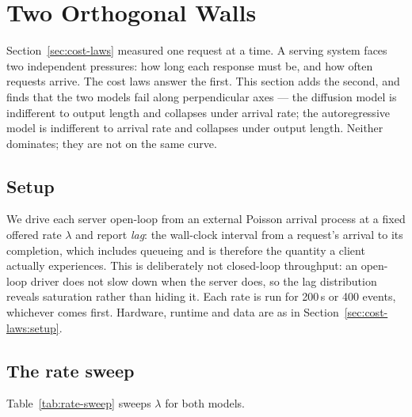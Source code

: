 \section{Two Orthogonal Walls}
\label{sec:two-walls}

Section~\ref{sec:cost-laws} measured one request at a time. A serving system
faces two independent pressures: how long each response must be, and how often
requests arrive. The cost laws answer the first. This section adds the second,
and finds that the two models fail along perpendicular axes --- the diffusion
model is indifferent to output length and collapses under arrival rate; the
autoregressive model is indifferent to arrival rate and collapses under output
length. Neither dominates; they are not on the same curve.

\subsection{Setup}
\label{sec:two-walls:setup}

We drive each server open-loop from an external Poisson arrival process at a
fixed offered rate $\lambda$ and report \emph{lag}: the wall-clock interval from
a request's arrival to its completion, which includes queueing and is therefore
the quantity a client actually experiences. This is deliberately not
closed-loop throughput: an open-loop driver does not slow down when the server
does, so the lag distribution reveals saturation rather than hiding it. Each
rate is run for 200\,s or 400 events, whichever comes first. Hardware, runtime
and data are as in Section~\ref{sec:cost-laws:setup}.

\subsection{The rate sweep}
\label{sec:two-walls:rate}

Table~\ref{tab:rate-sweep} sweeps $\lambda$ for both models.

